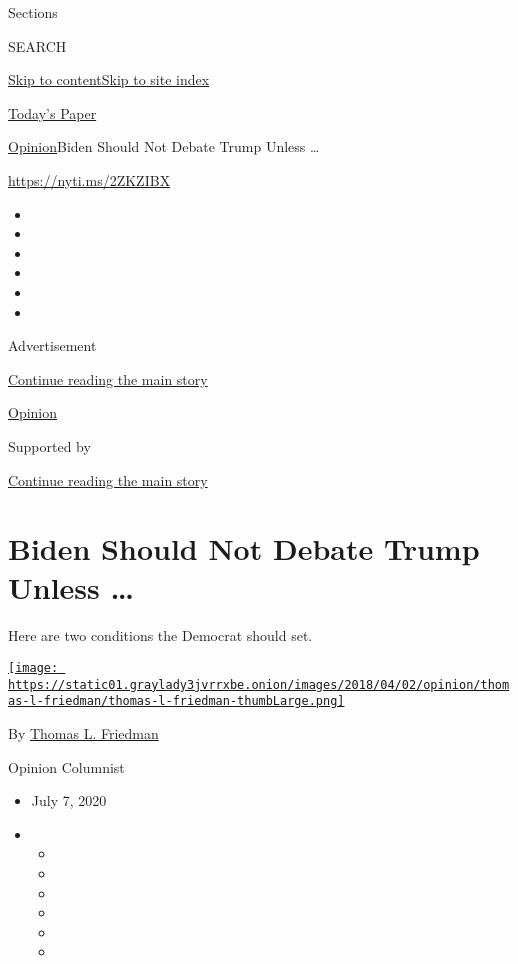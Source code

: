 Sections

SEARCH

\protect\hyperlink{site-content}{Skip to
content}\protect\hyperlink{site-index}{Skip to site index}

\href{https://myaccount.nytimes3xbfgragh.onion/auth/login?response_type=cookie\&client_id=vi}{}

\href{https://www.nytimes3xbfgragh.onion/section/todayspaper}{Today's
Paper}

\href{/section/opinion}{Opinion}\textbar{}Biden Should Not Debate Trump
Unless \ldots{}

\url{https://nyti.ms/2ZKZIBX}

\begin{itemize}
\item
\item
\item
\item
\item
\item
\end{itemize}

Advertisement

\protect\hyperlink{after-top}{Continue reading the main story}

\href{/section/opinion}{Opinion}

Supported by

\protect\hyperlink{after-sponsor}{Continue reading the main story}

\hypertarget{biden-should-not-debate-trump-unless-}{%
\section{Biden Should Not Debate Trump Unless
\ldots{}}\label{biden-should-not-debate-trump-unless-}}

Here are two conditions the Democrat should set.

\href{https://www.nytimes3xbfgragh.onion/by/thomas-l-friedman}{\texttt{[image: https://static01.graylady3jvrrxbe.onion/images/2018/04/02/opinion/thomas-l-friedman/thomas-l-friedman-thumbLarge.png]}}

By \href{https://www.nytimes3xbfgragh.onion/by/thomas-l-friedman}{Thomas
L. Friedman}

Opinion Columnist

\begin{itemize}
\item
  July 7, 2020
\item
  \begin{itemize}
  \item
  \item
  \item
  \item
  \item
  \item
  \end{itemize}
\end{itemize}

